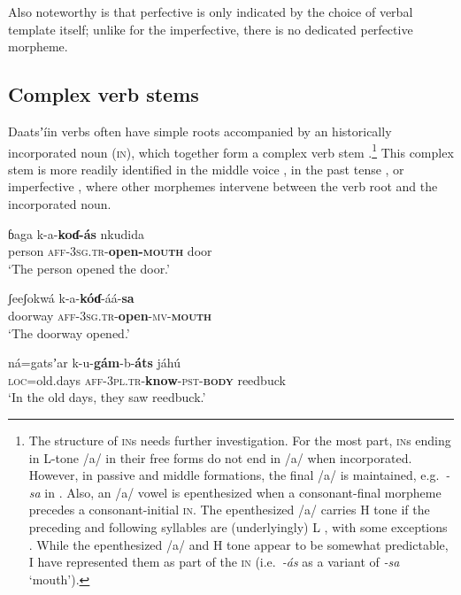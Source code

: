 \documentclass[output=paper]{langsci/langscibook}
\begin{document}
Also noteworthy is that perfective is only indicated by the choice of verbal template itself; unlike for the imperfective, there is no dedicated perfective morpheme.

\subsection{Complex verb stems}\label{sec:ahlandc:4.1}

Daatsʼíin verbs often have simple roots accompanied by an historically incorporated noun (\textsc{in}), which together form a complex verb stem .\footnote{The structure of \textsc{in}s needs further investigation. For the most part, \textsc{in}s ending in L-tone /a/ in their free forms do not end in /a/ when incorporated. However, in passive and middle formations, the final /a/ is maintained, e.g.\ \textit{{}-sa} in . Also, an /a/ vowel is epenthesized when a consonant-final morpheme precedes a consonant-initial \textsc{in}. The epenthesized /a/ carries H tone if the preceding and following syllables are (underlyingly) L , with some exceptions . While the epenthesized /a/ and H tone appear to be somewhat predictable, I have represented them as part of the \textsc{in} (i.e.\ \textit{{}-ás} as a variant of \textit{{}-sa} ‘mouth’). } This complex stem is more readily identified in the middle voice , in the past tense , or imperfective , where other morphemes intervene between the verb root and the incorporated noun.

\ea\label{ex:ahlandc:8}
\gll
ɓaga  k-a-\textbf{koɗ-ás}    nkudida  \\ 
person  \textsc{aff}{}-\textsc{3sg.tr}{}-\textbf{open-}\textbf{\textsc{mouth}}    door \\
\glt
‘The person opened the door.’ 
\z

\ea\label{ex:ahlandc:9}
\gll 
ʃeeʃokwá   k-a-\textbf{k\'{o}ɗ}{}-áá-\textbf{sa} \\
doorway   \textsc{aff-3sg.tr}{}-\textbf{open}{}-\textsc{mv-}\textbf{\textsc{mouth}} \\
\glt
‘The doorway opened.’
\z

\ea\label{ex:ahlandc:10}
\gll 
ná=gatsʼar  k-u-\textbf{gám}{}-b-\textbf{áts}                             jáhú \\
\textsc{loc}=old.days  \textsc{aff}\textsc{{}-3pl.tr}{}-\textbf{know}{}-\textsc{pst-}\textbf{\textsc{body}}    reedbuck \\
\glt
‘In the old days, they saw reedbuck.’
\z
\end{document}
